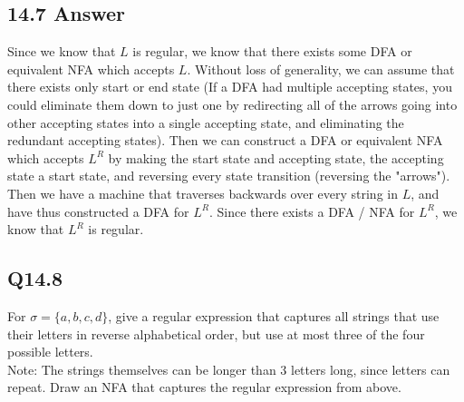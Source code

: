 \documentclass{article}
\begin{document}
\subsection*{14.7 Answer}
Since we know that $L$ is regular, we know that there exists some DFA or equivalent NFA which accepts $L$. Without loss of generality, we can
assume that there exists only start or end state (If a DFA had multiple accepting states, you could eliminate them down to just one 
by redirecting all of the arrows going into other accepting states into a single accepting state, and eliminating the redundant accepting
states). Then we can construct a DFA or equivalent NFA which accepts $L^R$ by making the start state and accepting state, the accepting state
a start state, and reversing every state transition (reversing the "arrows"). Then we have a machine that traverses backwards over every
string in $L$, and have thus constructed a DFA for $L^R$. Since there exists a DFA / NFA for $L^R$, we know that $L^R$ is regular.
\newpage
\subsection*{Q14.8}
For $\sigma=\{a,b,c,d\}$, give a regular expression that captures all strings that use their letters in reverse alphabetical order, but use at most three of the four possible letters.
\\ Note: The strings themselves can be longer than 3 letters long, since letters can repeat.
 Draw an NFA that captures the regular expression from above.
\newpage
\end{document}
